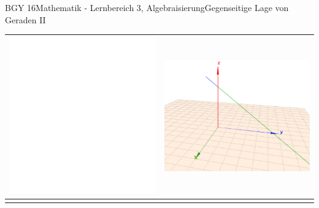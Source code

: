\documentclass[oneside,openany,headings=optiontotoc,11pt,numbers=noenddot]{scrreprt}
\begin{document}
\begin{worksheet}{BGY 16}{Mathematik - Lernbereich 3, Algebraisierung}{Gegenseitige Lage von Geraden II}
\begin{framed}
\begin{center}
\begin{tabularx}{\textwidth}{Xr}
					\includegraphics[scale=0.36]{../empty.jpg} & \includegraphics[scale=0.4]{Bilder/ghGleich3D.png}\\
					\hline\\

\end{tabularx}
\end{center}
\end{framed}
\end{worksheet}
\end{document}
